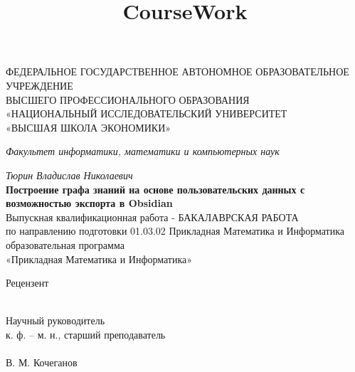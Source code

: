 \documentclass{article}
\title{CourseWork}
\author{}
\date{}
\begin{document}
\setlength{\parindent}{1.25cm}
\setlength{\footnotemargin}{5pt}
\sloppy
\frenchspacing %

\thispagestyle{empty}
\begin{center}

    ФЕДЕРАЛЬНОЕ  ГОСУДАРСТВЕННОЕ АВТОНОМНОЕ ОБРАЗОВАТЕЛЬНОЕ
    УЧРЕЖДЕНИЕ \\
    ВЫСШЕГО ПРОФЕССИОНАЛЬНОГО ОБРАЗОВАНИЯ \\
    «НАЦИОНАЛЬНЫЙ ИССЛЕДОВАТЕЛЬСКИЙ УНИВЕРСИТЕТ \\
    «ВЫСШАЯ ШКОЛА ЭКОНОМИКИ»

    \bigbreak
    \bigbreak

    \textit{Факультет информатики, математики и компьютерных наук} \\

    \bigbreak
    \bigbreak

    \textit{Тюрин Владислав Николаевич} \\

    \bigbreak
    \textbf{Построение графа знаний на основе пользовательских данных с возможностью экспорта в Obsidian} \\
    \bigbreak
    Выпускная квалификационная работа - БАКАЛАВРСКАЯ РАБОТА \\
    по направлению подготовки 01.03.02 Прикладная Математика и Информатика \\
    образовательная программа \\
    «Прикладная Математика и Информатика» \\

    
\end{center}

\renewcommand{\footnotesize}{\fontsize{14pt}{14pt}\selectfont} %
\vspace{50pt}

\noindent
\begin{minipage}[t]{0.45\textwidth}
    Рецензент \\
    \\ %
\end{minipage}
\hfill
\begin{minipage}[t]{0.5\textwidth}
    \begin{flushright}
        Научный руководитель \\
        к. ф. – м. н., старший преподаватель \\
        \underline{\hspace{5cm}} \\
        В. М. Кочеганов
    \end{flushright}
\end{minipage}
\end{document}
